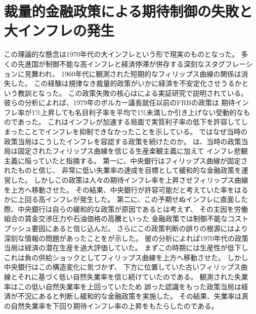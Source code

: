 \section{裁量的金融政策による期待制御の失敗と大インフレの発生}
\label{sec:chapter2_review_failure_of_discretionary_policy}
この理論的な懸念は1970年代の大インフレという形で現実のものとなった\parencite[][などを参照]{ClaridaGaliGertler1999,Mishkin1999,GoodfriendKing1997}。
多くの先進国が制御不能な高インフレと経済停滞が併存する深刻なスタグフレーションに見舞われ、
1960年代に観測された短期的なフィリップス曲線の関係は消失した。
この経験は規律なき裁量的政策がいかに経済を不安定化させうるかという教訓となった。
この政策失敗の核心は\textcite{ClaridaGaliGertler2000}による実証研究で説明されている。
彼らの分析によれば、1979年のボルカー議長就任以前のFRBの政策は
期待インフレ率が1\%上昇しても名目利子率を平均で1\%未満しか引き上げない受動的なものであった。
これはインフレが加速する局面で実質利子率の低下を許容してしまったことでインフレを抑制できなかったことを示している。
ではなぜ当時の政策当局はこうしたインフレを容認する政策を続けたのか。
\textcite{Bernanke2004}は、当時の政策当局は固定されたフィリップス曲線を信じる生産楽観主義に加えて
インフレ悲観主義に陥っていたと指摘する。
第一に、中央銀行はフィリップス曲線が固定されたものと信じ、
非常に低い失業率の達成を目標として緩和的な金融政策を運営した。
しかしこの政策は人々の期待インフレ率を上昇させフィリップス曲線を上方へ移動させた。
その結果、中央銀行が許容可能だと考えていた率をはるかに上回る高インフレが発生した。
第二に、この予期せぬインフレに直面した際、中央銀行は自らの緩和的な政策が原因であるとは考えず、
その主因を労働組合の賃金交渉圧力や石油価格の高騰といった
金融政策では制御不能なコストプッシュ要因にあると信じ込んだ。
さらにこの政策判断の誤りの根源にはより深刻な情報の問題があったことを\textcite{Orphanides2003}が示した。
彼の分析によれば1970年代の政策当局は経済の潜在生産を過大評価していた。
まずこの時期には生産性が低下しこれは負の供給ショックとしてフィリップス曲線を上方へ移動させた。
しかし中央銀行はこの構造変化に気づかず、
下方に位置していた古いフィリップス曲線とそれに基づく低い自然失業率を信じ続けていたのである。
観測された失業率はこの低い自然失業率を上回っていたため
誤った認識をもった政策当局は経済が不況にあると判断し緩和的な金融政策を実施した。
その結果、失業率は真の自然失業率を下回り期待インフレ率の上昇をもたらしたのである。

